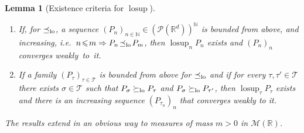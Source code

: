 \documentclass[10pt,a4paper]{article}
\providecommand{\skpt}{\smallskip}
\providecommand{\ie}{i.e.\ }
\theoremstyle{plain}
\newtheorem{lem}[them]{Lemma}
\theoremstyle{definition}
\newcommand{\Tt}{{\mathcal T}}
\newcommand{\p}{\mathcal{P}}
\newcommand{\m}{\mathcal{M}}
\newcommand{\R}{\mathbb{R}}
\newcommand{\N}{\mathbb{N}}
\newcommand{\lcsup}{\operatorname{losup}}
\newcommand{\leqlc}{\preceq_{\rm lo}}
\newcommand{\geqlc}{\succeq_{\rm lo}}
\begin{document}
\skpt
\begin{lem}[Existence criteria for $\lcsup$]
\label{lem:sto_order}
\begin{enumerate}
\item
\label{item:suite_croissante_majoree} If, for $\leqlc$, a sequence $(P_n)_{n\in \N}\!\in\!(\p(\R^d))^\N$ is bounded from above, and increasing, \ie $n\!\leqslant\! m\Rightarrow P_{n}\!\leqlc\! P_{m}$, then $\lcsup_nP_n$ exists and $(P_n)_{n}$ converges weakly~to~it.

\item
\label{item:treillis} If a family $(P_\tau)_{\tau\in\Tt}$ is bounded from above for $\leqlc$ and if for every $\tau,\tau'\in \Tt$ there exists $\sigma\in \Tt$ such that $P_\sigma\geqlc P_\tau$ and $P_\sigma\geqlc P_{\tau'}$, then $\lcsup_\tau P_\tau$ exists and there is an increasing sequence $(P_{\tau_n})_n$
that converges weakly to it.
\end{enumerate}
The results extend in an obvious way to measures of mass $m>0$ in $\m(\R)$.
\end{lem}
\end{document}
